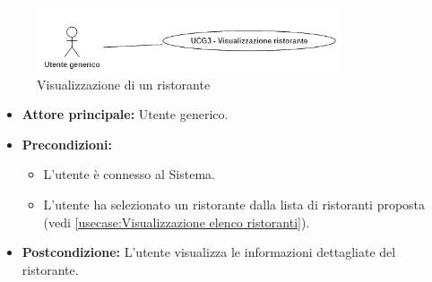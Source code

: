 \newpage
{}  
\label{usecase:Visualizzazione di un ristorante}

\begin{figure}[h]
	\centering
	\includegraphics[width=0.8\textwidth]{./uml/UCG3.png} 
	\caption{Visualizzazione di un ristorante}
	\label{fig:UCG3}
\end{figure}

\begin{itemize}

	\item \textbf{Attore principale:} Utente generico.

	\item \textbf{Precondizioni:}
	\begin{itemize}
        \item L'utente è connesso al Sistema.
        \item L'utente ha selezionato un ristorante dalla lista di ristoranti proposta (vedi \autoref{usecase:Visualizzazione elenco ristoranti}).
    \end{itemize}

	\item \textbf{Postcondizione:} L'utente visualizza le informazioni dettagliate del ristorante.


\end{itemize}
